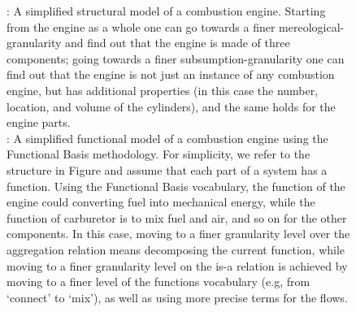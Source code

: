 \documentclass[
]{ceurart}
\begin{document}
\begin{figure}
\begin{subfigure}{0.40\textwidth}
    \caption{}
    \label{fig:2-ways-granularity-table-function}
    \end{subfigure}
\caption{: A simplified structural model of a combustion engine. Starting from the engine as a whole one can go towards a finer mereological-granularity and find out that the engine is made of three components; going towards a finer subsumption-granularity one can find out that the engine is not just an instance of any combustion engine, but has additional properties (in this case the number, location, and volume of the cylinders), and the same holds for the engine parts. \\
: A simplified functional model of a combustion engine using the Functional Basis methodology. For simplicity, we refer to the structure in Figure  and assume that each part of a system has a function. Using the Functional Basis vocabulary, the function of the engine could converting fuel into mechanical energy, while the function of carburetor is to mix fuel and air, and so on for the other components. In this case, moving to a finer granularity level over the aggregation relation means decomposing the current function, while moving to a finer granularity level on the is-a relation is achieved by moving to a finer level of the functions vocabulary (e.g, from `connect' to `mix'), as well as using more precise terms for the flows.}
\label{fig:due-figure}
\end{figure}



\end{document}
